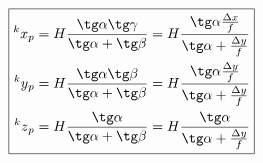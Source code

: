 \documentclass[a4paper, 12pt]{article}
\begin{document}
    \begin{equation*}
        \label{eq:camcoord}
        \boxed{
            \begin{aligned}
                \prescript{k}{}{x}_p = H\frac{\tg\alpha\tg\gamma}{\tg\alpha+\tg\beta} = H\frac{\tg\alpha\frac{\Delta x}{f}}{\tg\alpha+\frac{\Delta y}{f}}\\
                \prescript{k}{}{y}_p = H\frac{\tg\alpha\tg\beta}{\tg\alpha+\tg\beta} = H\frac{\tg\alpha\frac{\Delta y}{f}}{\tg\alpha+\frac{\Delta y}{f}}\\
                \prescript{k}{}{z}_p = H\frac{\tg\alpha}{\tg\alpha+\tg\beta} = H\frac{\tg\alpha}{\tg\alpha+\frac{\Delta y}{f}}
            \end{aligned}
        }
    \end{equation*}
\end{document}
